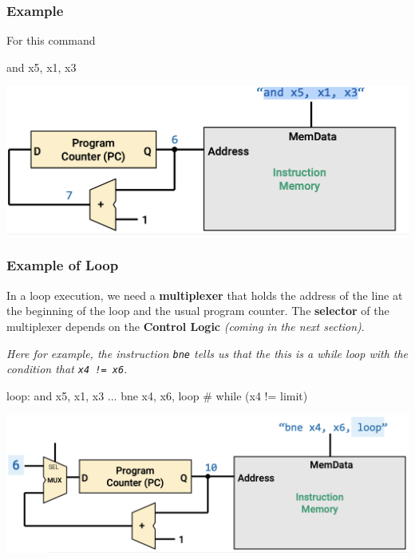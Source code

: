 \documentclass[12pt,openany]{book}
\begin{document}
\subsubsection{Example}
\begin{minipage}[htp]{0.4\textwidth}
For this command
\begin{assembly}
and x5, x1, x3
\end{assembly}
\end{minipage}
\hfill
\vline
\hfill
\begin{minipage}[p]{0.5\textwidth}
	\begin{center}
		\includegraphics[width=1\textwidth]{circuits/19.4.2_3.png}
	\end{center}
\end{minipage}

\subsubsection{Example of Loop}
In a loop execution, we need a \textbf{multiplexer} that holds the address of the line at the beginning of the loop and the usual program counter. \newline The \textbf{selector} of the multiplexer depends on the \textbf{Control Logic}\textit{ (coming in the next section)}.\newline
\vspace*{5px}
\begin{minipage}[htp]{0.45\textwidth}{
\textit{Here for example, the instruction \texttt{bne} tells us that the this is a while loop with the condition that \texttt{x4 != x6}.
}
\begin{assembly}
loop: and x5, x1, x3
	...
	bne x4, x6, loop # while (x4 != limit)
\end{assembly}
}
\end{minipage}
\hfill
\vline
\hfill
\begin{minipage}[p]{0.5\textwidth}
	\begin{center}
		\includegraphics[width=1\textwidth]{circuits/19.4.2_4.png}
	\end{center}
\end{minipage}
\end{document}
